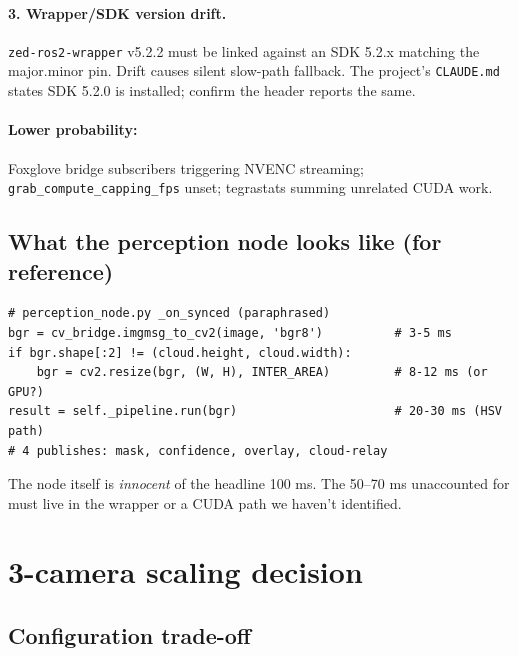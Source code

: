 \documentclass[11pt]{article}
\begin{document}
\paragraph{3. Wrapper/SDK version drift.}
\texttt{zed-ros2-wrapper} v5.2.2 must be linked against an SDK 5.2.x
matching the major.minor pin. Drift causes silent slow-path fallback. The
project's \texttt{CLAUDE.md} states SDK 5.2.0 is installed; confirm the
header reports the same.

\paragraph{Lower probability:} Foxglove bridge subscribers triggering NVENC
streaming; \texttt{grab\_compute\_capping\_fps} unset; tegrastats summing
unrelated CUDA work.

\subsection{What the perception node looks like (for reference)}

\begin{lstlisting}
# perception_node.py _on_synced (paraphrased)
bgr = cv_bridge.imgmsg_to_cv2(image, 'bgr8')          # 3-5 ms
if bgr.shape[:2] != (cloud.height, cloud.width):
    bgr = cv2.resize(bgr, (W, H), INTER_AREA)         # 8-12 ms (or GPU?)
result = self._pipeline.run(bgr)                      # 20-30 ms (HSV path)
# 4 publishes: mask, confidence, overlay, cloud-relay
\end{lstlisting}

The node itself is \emph{innocent} of the headline 100 ms. The 50--70 ms
unaccounted for must live in the wrapper or a CUDA path we haven't
identified.

\section{3-camera scaling decision}

\subsection{Configuration trade-off}
\end{document}
